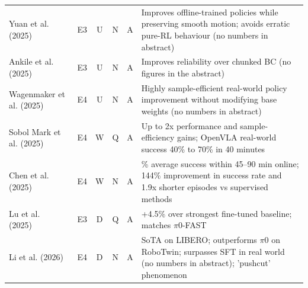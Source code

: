 \documentclass[10pt,a4paper]{article}
\begin{document}
\begin{longtable}{@{}>{\raggedright\arraybackslash}p{4.0cm}cccc>{\raggedright\arraybackslash}p{7.6cm}@{}}
Yuan et al. (2025)~\cite{Yuan2025} & E3 & U & N & A & Improves offline-trained policies while preserving smooth motion; avoids erratic pure-RL behaviour (no numbers in abstract) \\
Ankile et al. (2025)~\cite{Ankile2025} & E3 & U & N & A & Improves reliability over chunked BC (no figures in the abstract) \\
Wagenmaker et al. (2025)~\cite{Wagenmaker2025} & E4 & U & N & A & Highly sample-efficient real-world policy improvement without modifying base weights (no numbers in abstract) \\
Sobol Mark et al. (2025)~\cite{Mark2025} & E4 & W & Q & A & Up to 2x performance and sample-efficiency gains; OpenVLA real-world success 40\% to 70\% in 40 minutes \\
Chen et al. (2025)~\cite{Chen2025} & E4 & W & N & A & 96.3\% average success within 45--90 min online; 144\% improvement in success rate and 1.9x shorter episodes vs supervised methods \\
Lu et al. (2025)~\cite{Lu2025} & E3 & D & Q & A & +4.5\% over strongest fine-tuned baseline; matches $\pi$0-FAST \\
Li et al. (2026)~\cite{Li2026} & E4 & D & N & A & SoTA on LIBERO; outperforms $\pi$0 on RoboTwin; surpasses SFT in real world (no numbers in abstract); 'pushcut' phenomenon \\
\bottomrule\end{longtable}
\end{document}
